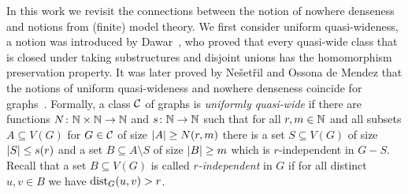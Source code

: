 \begin{comment}
These alternative characterizations have been very useful in 
the design of efficient algorithms. For instance, 
the {\sc{Subgraph Isomorphism}} and {\sc{Homomorphism}} problems 
are fixed-parameter tractable on any nowhere dense
class, parameterized by the size of the pattern graph~\cite{nevsetvril2010first}
and so is the {\sc Distance-$r$ Dominating Set} problem, parameterized
by the size of the solution~\cite{DawarK09}. In fact, 
the {\sc Distance-$r$ Dominating Set} problem admits
polynomial kernels~\cite{siebertz2016polynomial} and even 
almost linear kernels on nowhere dense classes of 
graphs~\cite{eickmeyer2016neighborhood}
(see also~\cite{drange2016kernelization} for the case $r=1$). 
It was shown in~\cite{grohe2014deciding}
that every first-order definable problem can be decided in
almost linear time on any nowhere dense graph class.

It is a natural question to ask for the most general classes of graphs
which admit efficient solutions for certain problems, or to 
classify them into tractable and intractable classes. It was shown 
that for the first-order model-checking problem~\cite{dvovrak2013testing} and for
the {\sc Distance-$r$ Dominating Set} problem~\cite{drange2016kernelization} 
the dividing line for algorithmic tractability 
on subgraph closed classes of graphs is exactly between the
nowhere dense and somewhere dense graph classes. 
\end{comment}


In this work we revisit the connections between the notion of nowhere 
denseness and notions from (finite) model theory.
We first consider uniform quasi-wideness, a
notion was introduced by Dawar~\cite{dawar2010homomorphism}, who 
proved that every quasi-wide class that is closed under taking substructures
and disjoint unions has the homomorphism preservation property. It was 
later proved by Ne\v{s}et\v{r}il and Ossona de Mendez that 
the notions of uniform quasi-wideness and nowhere denseness coincide for 
graphs~\cite{nevsetvril2011nowhere}. 
Formally, a class $\mathcal{C}$ of graphs is \emph{uniformly quasi-wide} if there are
functions $N\colon \mathbb{N}\times\mathbb{N}\rightarrow \mathbb{N}$ and $s\colon \mathbb{N}\rightarrow \mathbb{N}$ such
that for all $r,m\in \mathbb{N}$ and all subsets $A\subseteq V(G)$ for
$G\in \mathcal{C}$ of size $\left\lvert A\right\rvert\geq N(r,m)$ there is a set
$S\subseteq V(G)$ of size $\left\lvert S\right\rvert\leq s(r)$ and a set
$B\subseteq A\setminus S$ of size $\left\lvert B\right\rvert\geq m$ which is $r$-independent in
$G-S$. Recall that a set $B\subseteq V(G)$ is called {\em{$r$-independent}} in $G$ if for all
distinct $u,v\in B$ we have $\mathrm{dist}_G(u,v)>r$.

